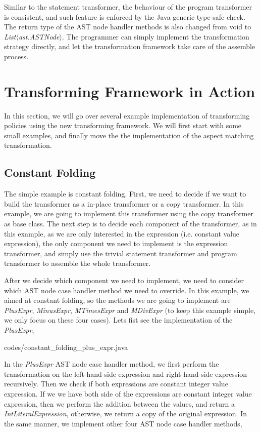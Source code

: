 \documentclass{comp621}
\begin{document}
Similar to the statement transformer, the behaviour of the program transformer
is consistent, and such feature is enforced by the Java generic type-safe
check. The return type of the AST node handler methods is also changed from
void to \emph{List$\langle$ast.ASTNode$\rangle$}. The programmer can simply
implement the transformation strategy directly, and let the transformation
framework take care of the assemble process.

\section{Transforming Framework in Action}

In this section, we will go over several example implementation of transforming
policies using the new transforming framework. We will first start with some
small examples, and finally move the the implementation of the aspect matching
transformation.

\subsection{Constant Folding}

The simple example is constant folding. First, we need to decide if we want to
build the transformer as a in-place transformer or a copy transformer. In this
example, we are going to implement this transformer using the copy transformer
as base class. The next step is to decide each component of the transformer, as
in this example, as we are only interested in the expression (i.e. constant
value expression), the only component we need to implement is the expression
transformer, and simply use the trivial statement transformer and program
transformer to assemble the whole transformer.

After we decide which component we need to implement, we need to consider which
AST node case handler method we need to override. In this example, we aimed at
constant folding, so the methods we are going to implement are \emph{PlusExpr},
\emph{MinusExpr}, \emph{MTimesExpr} and \emph{MDivExpr} (to keep this example
simple, we only focus on these four cases). Lets fist see the implementation of
the \emph{PlusExpr},


                {codes/constant_folding_plus_expr.java}

In the \emph{PlusExpr} AST node case handler method, we first perform the
transformation on the left-hand-side expression and right-hand-side expression 
recursively. Then we check if both expressions are constant integer value
expression. If we we have both side of the expressions are constant integer
value expression, then we perform the addition between the values, and return a
\emph{IntLiteralExpression}, otherwise, we return a copy of the original
expression. In the same manner, we implement other four AST node case handler
methods,
\end{document}
